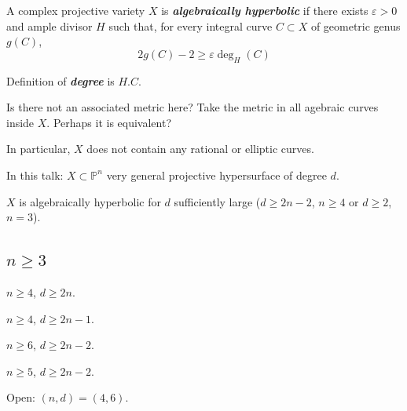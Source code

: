 \begin{defn}\leavevmode
	A complex projective variety $X$ is \textit{\textbf{algebraically hyperbolic}} if there exists $\varepsilon>0$ and ample divisor $H$ such that, for every integral curve $C \subset X$ of geometric genus $g(C)$,
	\[2g(C)-2 \geq \varepsilon \operatorname{deg}_H(C)\]
\end{defn}

\begin{remark}[Vitorio]\leavevmode
	Definition of \textit{\textbf{degree}} is $H.C$.
\end{remark}

\begin{remark}[Misha]\leavevmode
	Is there not an associated metric here? Take the metric in all agebraic curves inside $X$. Perhaps it is equivalent?
\end{remark}

\begin{remark}\leavevmode
	In particular, $X$ does not contain any rational or elliptic curves.
\end{remark}

In this talk: $X \subset \mathbb{P}^n$ very general projective hypersurface of degree $d$.

\begin{conjecture}[Kobayashi]
$X$ is algebraically hyperbolic for $d$ sufficiently large ($d\geq 2n-2$, $n\geq 4$ or $d\geq 2$, $n=3$).
\end{conjecture}

\subsection{\(n\geq 3\)}

\begin{thm}[Clemens '86, E. '88]\leavevmode
$n \geq  4$, $d\geq 2n$.
\end{thm}

\begin{thm}[Voisin, '96, 98]\leavevmode
$n \geq 4$, $d \geq  2n-1$.
\end{thm}

\begin{thm}\leavevmode
$n\geq 6$, $d \geq  2n-2$.
\end{thm}

\begin{thm}[Yeong '22]\leavevmode
$n\geq 5$, $d\geq 2n-2$.
\end{thm}

Open: $(n,d)=(4,6)$.

